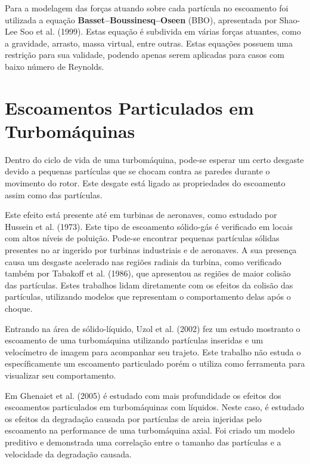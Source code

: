 Para a modelagem das forças atuando sobre cada partícula no escoamento foi utilizada a equação \textbf{Basset–Boussinesq–Oseen} (BBO), apresentada por Shao-Lee Soo et al. (1999)\cite{ShaoLeeSoo-1999}.
Estas equação é subdivida em várias forças atuantes, como a gravidade, arrasto, massa virtual, entre outras.
Estas equações possuem uma restrição para sua validade, podendo apenas serem aplicadas para casos com baixo número de Reynolds.


\section{\textbf{Escoamentos Particulados em Turbomáquinas}}
\label{sec_rev_EP}
Dentro do ciclo de vida de uma turbomáquina, pode-se esperar um certo desgaste devido a pequenas partículas que se chocam contra as paredes durante o movimento do rotor.
Este desgate está ligado as propriedades do escoamento assim como das partículas.

Este efeito está presente até em turbinas de aeronaves, como estudado por Hussein et al. (1973)\cite{Hussein-1973}.
Este tipo de escoamento sólido-gás é verificado em locais com altos níveis de poluição.
Pode-se encontrar pequenas partículas sólidas presentes no ar ingerido por turbinas industriais e de aeronaves.
A sua presença causa um desgaste acelerado nas regiões radiais da turbina, como verificado também por Tabakoff et al. (1986)\cite{Tabakoff-1986}, que apresentou as regiões de maior colisão das partículas.
Estes trabalhos lidam diretamente com os efeitos da colisão das partículas, utilizando modelos que representam o comportamento delas após o choque.

Entrando na área de sólido-líquido, Uzol et al. (2002)\cite{Uzol-2002} fez um estudo mostranto o escoamento de uma turbomáquina utilizando partículas inseridas e um velocímetro de imagem para acompanhar seu trajeto.
Este trabalho não estuda o específicamente um escoamento particulado porém o utiliza como ferramenta para visualizar seu comportamento.

Em Ghenaiet et al. (2005)\cite{Ghenaiet-2005} é estudado com mais profundidade os efeitos dos escoamentos particulados em turbomáquinas com líquidos.
Neste caso, é estudado os efeitos da degradação causada por partículas de areia injeridas pelo escoamento na performance de uma turbomáquina axial.
Foi criado um modelo preditivo e demonstrada uma correlação entre o tamanho das partículas e a velocidade da degradação causada.

